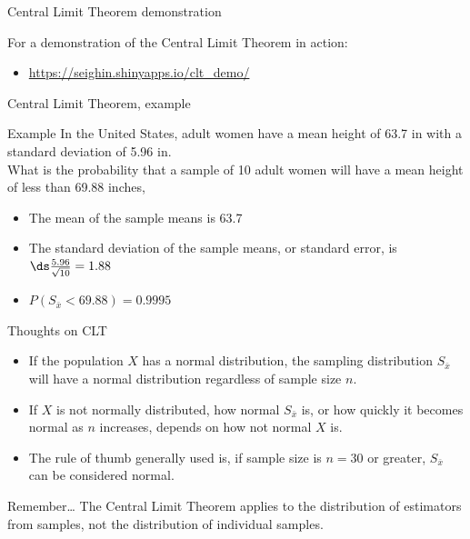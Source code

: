 \documentclass[xcolor=table]{beamer}
\begin{document}
\begin{frame}{Central Limit Theorem demonstration}
\begin{block}{}
\large
For a demonstration of the Central Limit Theorem in action:
\begin{itemize}
\item \url{https://seighin.shinyapps.io/clt_demo/}
\end{itemize}
\end{block}
\end{frame}

\begin{frame}{Central Limit Theorem, example}
\begin{exampleblock}{Example}
\large
In the United States, adult women have a mean height of 63.7 in with a standard deviation of 5.96 in. \\
\medskip
What is the probability that a sample of 10 adult women will have a mean height of less than 69.88 inches,
\begin{itemize}
\pause\item The mean of the sample means is 63.7
\pause\item The standard deviation of the sample means, or standard error, is $\ds \frac {5.96}{\sqrt{10}} = 1.88$  
\pause\item $P(S_{\bar x} < 69.88) = 0.9995$
\end{itemize}
\end{exampleblock}

\end{frame}

\begin{frame}{Thoughts on CLT}
\begin{block}{}
\large
\begin{itemize}
\item If the population $X$ has a normal distribution, the sampling distribution $S_{\bar x}$ will have a normal distribution regardless of sample size $n$.
\pause\item If $X$ is not normally distributed, how normal $S_{\bar x}$ is, or how quickly it becomes normal as $n$ increases, depends on how not normal $X$ is.
\pause\item The rule of thumb generally used is, if sample size is $n=30$ or greater, $S_{\bar x}$ can be considered normal.
\end{itemize}

\end{block}

\pause
\begin{alertblock}{Remember\ldots}
The Central Limit Theorem applies to the distribution of estimators from samples, not the distribution of individual samples.
\end{alertblock}
\end{frame}
\end{document}
